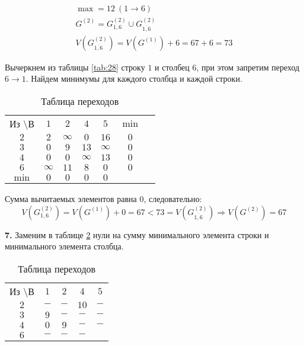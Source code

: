 \vspace{-1cm}
\begin{gather*}
\max = 12\ (1 \rightarrow 6) \\
G^{(2)} = G_{1,6}^{(2)} \cup G_{\overline{1,6}}^{(2)} \\
V(G_{\overline{1,6}}^{(2)}) = V(G^{(1)}) + 6 = 67 + 6 = 73
\end{gather*}

Вычеркнем из таблицы \ref{tab:28} строку $1$ и столбец $6$, при этом запретим переход $6 \rightarrow 1$. Найдем минимумы для каждого столбца и каждой строки.

\begin{table}[H]
\begin{center}
	\def\tabcolsep{15pt}
	\caption{Таблица переходов}
	\label{tab:29}
	\begin{tabular}{|c||c|c|c|c|c|c|}
		\hline
		Из \textbackslash В & $1$ & $2$ & $4$ & $5$ & $\min$ \\
		\hhline{|=#=|=|=|=|=|}
		$2$ & $2$ & $\infty$ & $0$ & $16$ & $0$ \\
		\hline
		$3$ & $0$ & $9$ & $13$ & $\infty$ & $0$  \\ 
		\hline
		$4$ & $0$ & $0$ & $\infty$ & $13$ & $0$  \\
		\hline
		$6$ & $\infty$ & $11$ & $8$ & $0$ & $0$  \\
		\hhline{|=#=|=|=|=|=|}
		$\min$ & $0$ & $0$ & $0$ & $0$ & \\ 
		\hline
	\end{tabular}
\end{center}
\end{table}

Сумма вычитаемых элементов равна $0$, следовательно:
\begin{equation*}
V(G_{1,6}^{(2)}) = V(G^{(1)}) + 0 = 67 < 73 = V(G_{\overline{1,6}}^{(2)})\Rightarrow V(G^{(2)}) = 67
\end{equation*}

\textbf{7.} Заменим в таблице \ref{tab:30} нули на сумму минимального элемента строки и минимального элемента столбца. 

\begin{table}[H]
\begin{center}
	\def\tabcolsep{15pt}
	\caption{Таблица переходов}
	\label{tab:30}
	\begin{tabular}{|c||c|c|c|c|}
		\hline
		Из \textbackslash В & $1$ & $2$ & $4$ & $5$ \\
		\hhline{|=#=|=|=|=|}
		$2$ & $-$ & $-$ & $10$ & $-$ \\
		\hline
		$3$ & $9$ & $-$ & $-$ & $-$ \\ 
		\hline
		$4$ & $0$ & $9$ & $-$ & $-$ \\
		\hline
		$6$ & $-$ & $-$ & $-$ & \redbold{$21$} \\
		\hline
	\end{tabular}
\end{center}
\end{table}

